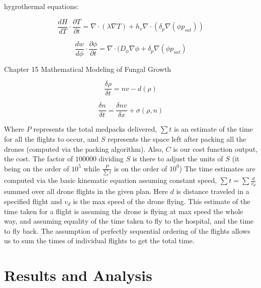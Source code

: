 \documentclass[12pt]{article}
\begin{document}
\begin{multicols}{2}
hygrothermal equations:

\begin{equation}
\frac{dH}{dT}\cdot\frac{\partial T}{\partial t}=\nabla\cdot(\lambda\nabla T)+h_v\nabla\cdot(\delta_{p}\nabla(\phi p_{sat}))
\end{equation}

\begin{equation}
\frac{dw}{d\phi}\cdot\frac{\partial \phi}{\partial t}=\nabla\cdot(D_{\phi}\nabla\phi+\delta_{p}\nabla(\phi p_{sat})
\end{equation}

Chapter 15 Mathematical Modeling of Fungal Growth

\begin{equation}
\frac{\delta\rho}{\delta t}=nv-d(\rho)
\end{equation}

\begin{equation}
\frac{\delta n}{\delta t}=\frac{\delta nv}{\delta x}+\sigma(\rho, n)
\end{equation}


Where $P$ represents the total medpacks delivered, $\sum{t}$ is an estimate of the time for all the flights to occur, and $S$ represents the space left after packing all the drones (computed via the packing algorithm). Also, $C$ is our cost function output, the cost. The factor of $100000$ dividing $S$ is there to adjust the units of $S$ (it being on the order of $10^5$ while $\frac{P}{\sum{t}}$ is on the order of $10^0$) The time estimates are computed via the basic kinematic equation assuming constant speed, $\sum{t}=\sum{\frac{d}{v_d}}$ summed over all drone flights in the given plan. Here $d$ is distance traveled in a specified flight and $v_d$ is the max speed of the drone flying. This estimate of the time taken for a flight is assuming the drone is flying at max speed the whole way, and assuming equality of the time taken to fly to the hospital, and the time to fly back. The assumption of perfectly sequential ordering of the flights allows us to sum the times of individual flights to get the total time.

\section{Results and Analysis}


\end{multicols}
\end{document}
